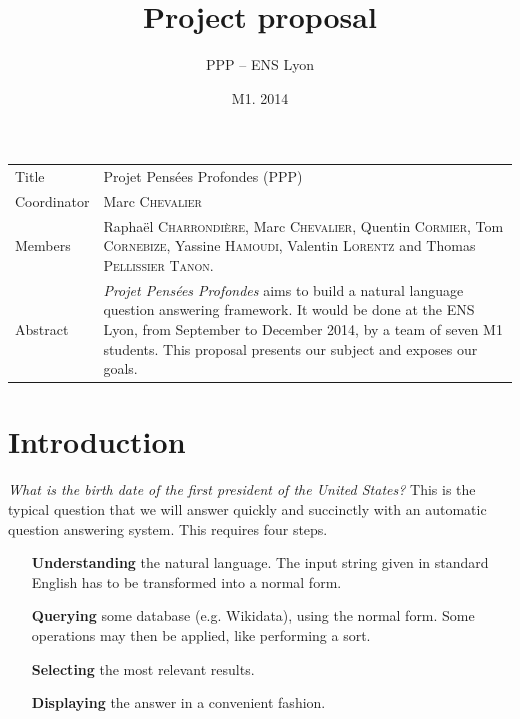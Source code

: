 \documentclass[a4paper,10pt]{article}
\title{Project proposal}
\author{PPP \--- ENS Lyon}
\date{M1. 2014}
\begin{document}
\maketitle

\newlength{\title}
\settowidth{\title}{Coordinator }

\newlength{\object}
\setlength{\object}{\textwidth} \addtolength{\object}{-\title} \addtolength{\object}{-6.8pt} 
	\addtolength{\object}{-2\tabcolsep}

\renewcommand{\arraystretch}{1.5}

\begin{center}
\begin{tabular}{@{}|p{\title}p{\object}@{}|}
\hline
Title & Projet Pensées Profondes (PPP)\\
Coordinator & Marc \textsc{Chevalier}\\
Members & Raphaël \textsc{Charrondière}, Marc \textsc{Chevalier}, Quentin 
      \textsc{Cormier}, Tom \textsc{Cornebize}, \linebreak Yassine \textsc{Hamoudi}, 
      Valentin \textsc{Lorentz} and Thomas \textsc{Pellissier} \textsc{Tanon}.\\
Abstract & \emph{Projet Pensées Profondes} aims to build a natural language question answering framework.
It would be done at the ENS Lyon, from September to December 2014, by a team of seven M1 students. This proposal presents
our subject and exposes our goals.\\
\hline
\end{tabular}
\end{center}

\section{Introduction}

\emph{What is the birth date of the first president of the United States?} This is the typical question that we will
answer quickly and succinctly with an automatic question answering system. This requires four steps.

\begin{itemize}
\item[\textbf{Understanding}] the natural language. The input string given in standard 
English has to be transformed into a normal form. 

\item[\textbf{Querying}] some database (e.g. Wikidata), using the normal form.
Some operations may then be applied, like performing a sort.

\item[\textbf{Selecting}] the most relevant results.

\item[\textbf{Displaying}] the answer in a convenient fashion.
\end{itemize}
\end{document}

